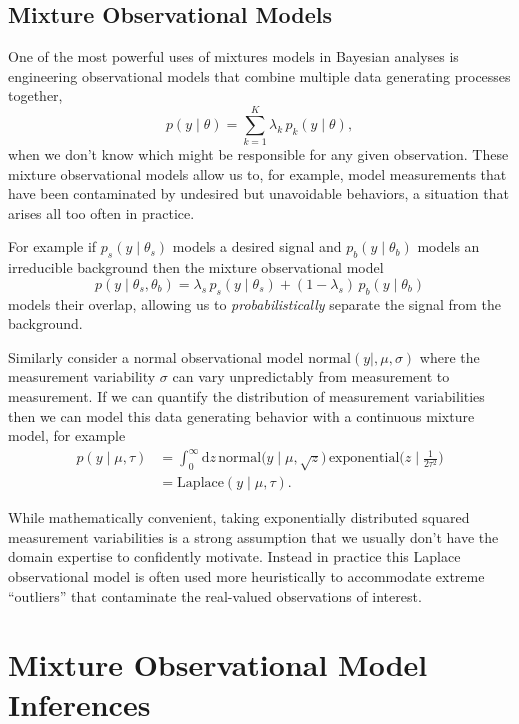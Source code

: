 \documentclass[
  letterpaper,
  DIV=11,
  numbers=noendperiod]{scrartcl}
\begin{document}
\subsection{Mixture Observational
Models}\label{mixture-observational-models}

One of the most powerful uses of mixtures models in Bayesian analyses is
engineering observational models that combine multiple data generating
processes together, \[
p(y \mid \theta) = \sum_{k = 1}^{K} \lambda_{k} \, p_{k}(y \mid \theta),
\] when we don't know which might be responsible for any given
observation. These mixture observational models allow us to, for
example, model measurements that have been contaminated by undesired but
unavoidable behaviors, a situation that arises all too often in
practice.

For example if \(p_{s}(y \mid \theta_{s})\) models a desired signal and
\(p_{b}(y \mid \theta_{b})\) models an irreducible background then the
mixture observational model \[
p(y \mid \theta_{s}, \theta_{b}) =
       \lambda_{s}  \, p_{s}(y \mid \theta_{s})
+ (1 - \lambda_{s}) \, p_{b}(y \mid \theta_{b})
\] models their overlap, allowing us to \emph{probabilistically}
separate the signal from the background.

Similarly consider a normal observational model
\(\text{normal}(y \mid, \mu, \sigma)\) where the measurement variability
\(\sigma\) can vary unpredictably from measurement to measurement. If we
can quantify the distribution of measurement variabilities then we can
model this data generating behavior with a continuous mixture model, for
example \begin{align*}
p(y \mid \mu, \tau)
&=
\int_{0}^{\infty} \mathrm{d} z \,
\text{normal} \bigg(y \mid \mu, \sqrt{z} \bigg) \,
\text{exponential} \bigg( z \mid \frac{1}{2 \tau^{2}} \bigg)
\\
&=
\text{Laplace}(y \mid \mu, \tau).
\end{align*}

While mathematically convenient, taking exponentially distributed
squared measurement variabilities is a strong assumption that we usually
don't have the domain expertise to confidently motivate. Instead in
practice this Laplace observational model is often used more
heuristically to accommodate extreme ``outliers'' that contaminate the
real-valued observations of interest.

\section{Mixture Observational Model
Inferences}\label{mixture-observational-model-inferences}
\end{document}
